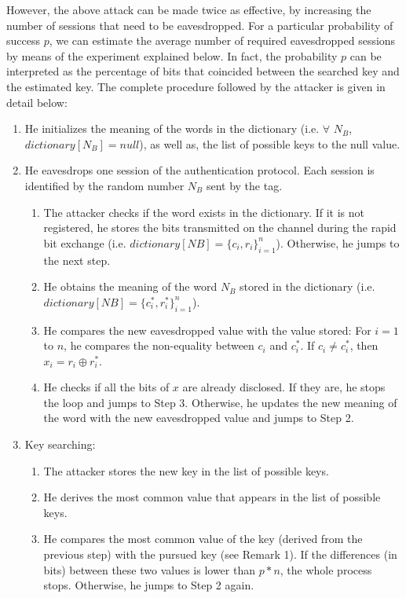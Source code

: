 \documentclass{article}
\begin{document}
However, the above attack can be made twice as effective, by increasing the number of sessions that need to be eavesdropped.  For a particular probability of success $p$, we can estimate the average number of required eavesdropped sessions by means of the experiment explained below. In fact, the probability $p$ can be interpreted as the percentage of bits that coincided between the searched key and the estimated key. The complete procedure followed by the attacker is given in detail below:

\begin{enumerate}
  \item  He initializes the meaning of the words in the dictionary (i.e. $\forall$ $N_B$, $dictionary[N_B]=null$), as well as, the list of possible keys to the null value. \item  He eavesdrops one session of the authentication protocol. Each session is identified by the random number $N_B$ sent by the tag.
      \begin{enumerate}
      \item The attacker checks if the word exists in the dictionary. If it is not registered, he stores the bits transmitted on the channel during the rapid bit exchange (i.e. $dictionary[NB] = \{c_i, r_i\}_{i=1}^n$). Otherwise, he jumps to the next step.
      \item He obtains the meaning of the word $N_B$ stored in the dictionary (i.e. $dictionary[NB] = \{c^*_i, r^*_i\}_{i=1}^n$).
      \item He compares the new eavesdropped value with the value stored: For $i=1$ to $n$, he compares the non-equality between $c_i$ and $c^*_i$. If $c_i \neq c^*_i$, then $x_i = r_i \oplus r^*_i$.
      \item He checks if all the bits of $x$ are already disclosed. If they are, he stops the loop and jumps to Step 3. Otherwise, he updates the new meaning of the word with the new  eavesdropped value and jumps to Step 2.
             \end{enumerate}
   \item Key searching:
   \begin{enumerate}
     \item The attacker stores the new key in the list of possible keys.
     \item He derives the most common value that appears in the list of possible keys. \item He compares the most common value of the key (derived from the previous step) with the pursued key (see Remark 1). If the differences (in bits) between these two values is lower than $p * n$, the whole process stops. Otherwise, he jumps to Step 2 again.
    \end{enumerate}
\end{enumerate}
\end{document}
